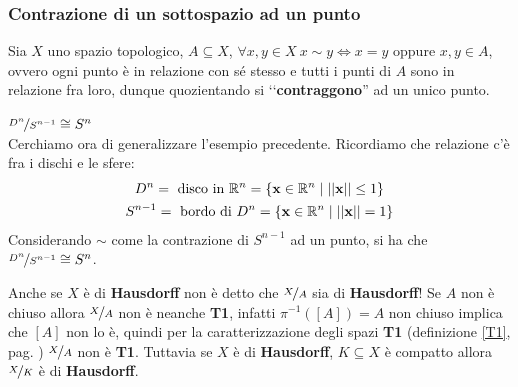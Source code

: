 \subsubsection{Contrazione di un sottospazio ad un punto}
Sia $X$ uno spazio topologico, $A\subseteq X$, $\forall x,y\in X \ x\sim y\iff x=y$ oppure $x,y\in A$, ovvero ogni punto è in relazione con sé stesso e tutti i punti di $A$ sono in relazione fra loro, dunque quozientando si ‘‘\textbf{contraggono}'' ad un unico punto.
\begin{example} $\nicefrac{D^n}{S^{n-1}}\cong S^n$ \\
	Cerchiamo ora di generalizzare l'esempio precedente. Ricordiamo che relazione c'è fra i dischi e le sfere:
		\begin{gather*}
			D^n=\text{ disco in } \mathbb{R}^n=\{\mathbf{x}\in\mathbb{R}^n \mid \left|\left| \mathbf{x} \right|\right| \leq 1 \}\\
			S^{n-1}=\text{ bordo di } D^n=\{\mathbf{x}\in\mathbb{R}^n \mid \left|\left| \mathbf{x} \right|\right| = 1 \}
		\end{gather*}
	Considerando $\sim$ come la contrazione di $S^{n-1}$ ad un punto, si ha che $\nicefrac{D^n}{S^{n-1}} \cong S^n$.
\end{example}

\begin{attention}
	Anche se $X$ è di \textbf{Hausdorff} non è detto che $\nicefrac{X}{A}$ sia di \textbf{Hausdorff}!\newline
	Se $A$ non è chiuso allora $\nicefrac{X}{A}$ non è neanche \textbf{T1}, infatti $\pi^{-1}([A])=A$ non chiuso implica che $[A]$ non lo è, quindi per la caratterizzazione degli spazi \textbf{T1} (definizione \ref{T1}, pag. \pageref{T1}) $\nicefrac{X}{A}$ non è \textbf{T1}.\newline 
	Tuttavia se $X$ è di \textbf{Hausdorff}, $K\subseteq X$ è compatto allora $\nicefrac{X}{K}$ è di \textbf{Hausdorff}.
\end{attention}
